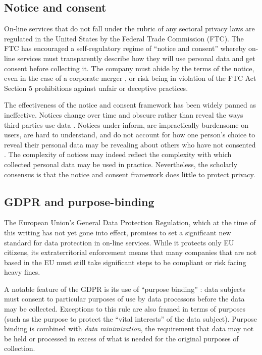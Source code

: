 \documentclass[../thesis.tex]{subfiles}
\begin{document}
\subsection{Notice and consent}

On-line services that do
not fall under the rubric of any sectoral privacy
laws are regulated in the United States by the
Federal Trade Commission (FTC).
The FTC has encouraged a self-regulatory regime
of ``notice and consent'' whereby on-line services
must transparently describe how they will use
personal data and get consent before collecting it.
The company must abide by the terms of the notice,
even in the case of a corporate merger \cite{hine_2015},
or risk being in violation of the FTC Act Section 5
prohibitions against unfair or deceptive practices. 

The effectiveness of the notice and consent framework
has been widely panned as ineffective.
Notices change over time and obscure rather than reveal
the ways third parties use data \cite{barocas2009notice}.
Notices under-inform, are impractically burdensome on users,
are hard to understand, and do not account for how
one person's choice to reveal their personal data
may be revealing about others who have not consented
\cite{reidenberg2015privacy} \cite{solove2012introduction}.
The complexity of notices may indeed reflect the complexity
with which collected personal data may be used
\cite{schaub2015design} in practice.
Nevertheless, the scholarly consensus is that
the notice and consent framework does little to
protect privacy.

\subsection{GDPR and purpose-binding}
\label{sec:GDPR}

The European Union's General Data Protection Regulation,
which at the time of this writing has not yet gone into
effect, promises to set a significant new standard for
data protection in on-line services.
While it protects only EU citizens, its extraterritorial
enforcement means that many companies that are not based in
the EU must still take significant steps to be compliant
or risk facing heavy fines.

A notable feature of the GDPR is its use of ``purpose binding''
\cite{hildebrandt2013slaves} \cite{herrmann2016privacy}:
data subjects must consent to particular purposes of use
by data processors before the data may be collected.
Exceptions to this rule are also framed in terms of purposes
(such as the purpose to protect the ``vital interests''
of the data subject).
Purpose binding is combined with \emph{data minimization},
the requirement
that data may not be held or processed in excess of what
is needed for the original purposes of collection.
\end{document}
